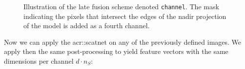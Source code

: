             \begin{figure}[htb]
                \centering
                
                \caption[
                    Illustration of the late fusion scheme denoted \texttt{channel}.
                ]{
                    \label{fig::channel}
                    Illustration of the late fusion scheme denoted \texttt{channel}.
                    The mask indicating the pixels that intersect the edges of the nadir projection of the model is added as a fourth channel.
                }
            \end{figure}

            Now we can apply the \gls{acr::scatnet} on any of the previously defined images.
            We apply then the same post-processing to yield feature vectors with the same dimensions per channel \(d \cdot n_S\):

